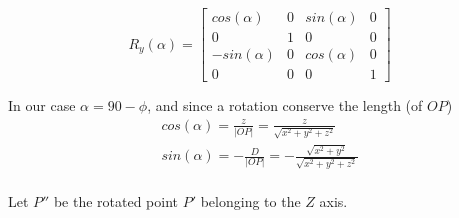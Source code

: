 \documentclass[a4paper,10pt]{article}
\begin{document}
\begin{equation}
R_y(\alpha) =
\begin{bmatrix}
	cos(\alpha)  & 0 & sin(\alpha) & 0 \\
	0 			 & 1 & 0		   & 0 \\
	-sin(\alpha) & 0 & cos(\alpha) & 0 \\
	0 			 & 0 & 0 		   & 1
\end{bmatrix}
\end{equation}

\noindent
In our case $\alpha = 90 - \phi$, and since a rotation conserve the length (of $OP$)
\begin{equation}
\left.\begin{aligned}
&cos(\alpha) = \frac{z}{|OP|} = \frac{z}{\sqrt{x^2 + y^2 + z^2}}&\\
&sin(\alpha) = -\frac{D}{|OP|} = -\frac{\sqrt{x^2 + y^2}}{\sqrt{x^2 + y^2 + z^2}}&\\
\end{aligned}\right.
\end{equation}

\bigskip \noindent
Let $P''$ be the rotated point $P'$ belonging to the $Z$ axis.
\end{document}
